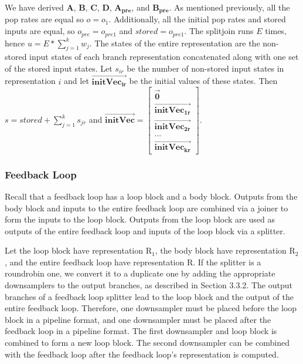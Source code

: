     We have derived $\mathbf{A}$, $\mathbf{B}$, $\mathbf{C}$,
$\mathbf{D}$, $\mathbf{A_{pre}}$, and $\mathbf{B_{pre}}$. As
mentioned previously, all the pop rates are equal so $o = o_1$.
Additionally, all the initial pop rates and stored inputs are
equal, so $o_{pre} = o_{pre1}$ and $stored = o_{pre1}$. The
splitjoin runs $E$ times, hence $u = E * \sum_{j=1}^{k} w_j$. The
states of the entire representation are the non-stored input
states of each branch representation concatenated along with one
set of the stored input states. Let $s_{ir}$ be the number of
non-stored input states in representation $i$ and let
$\overrightarrow{\mathbf{initVec_{ir}}}$ be the initial values of
these states. Then $s = stored + \sum_{j=1}^{k} s_{jr}$ and
$\overrightarrow{\mathbf{initVec}} =
\left [ \begin{array} {c} \vec{\mathbf{0}} \\ \overrightarrow{\mathbf{initVec_{1r}}} \\
\overrightarrow{\mathbf{initVec_{2r}}} \\ ... \\
\overrightarrow{\mathbf{initVec_{kr}}} \end{array} \right ]$.

\subsubsection{Feedback Loop}

    Recall that a feedback loop has a loop block and a body block.
Outputs from the body block and inputs to the entire feedback loop
are combined via a joiner to form the inputs to the loop block.
Outputs from the loop block are used as outputs of the entire
feedback loop and inputs of the loop block via a splitter.

    Let the loop block have representation $\mathrm{R_1}$, the body
block have representation $\mathrm{R_2}$, and the entire feedback
loop have representation $\mathrm{R}$. If the splitter is a
roundrobin one, we convert it to a duplicate one by adding the
appropriate downsamplers to the output branches, as described in
Section 3.3.2. The output branches of a feedback loop splitter
lead to the loop block and the output of the entire feedback loop.
Therefore, one downsampler must be placed before the loop block in
a pipeline format, and one downsampler must be placed after the
feedback loop in a pipeline format. The first downsampler and loop
block is combined to form a new loop block. The second downsampler
can be combined with the feedback loop after the feedback loop's
representation is computed.

